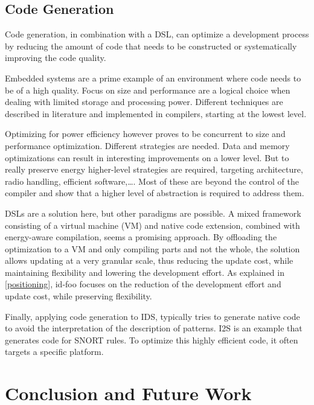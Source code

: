 \documentclass[conference]{IEEEtran}
\newcommand{\NAME}{id-foo\xspace}
\begin{document}
\subsection{Code Generation}

Code generation, in combination with a DSL, can optimize a development process
by reducing the amount of code that needs to be constructed or systematically
improving the code quality.

Embedded systems are a prime example of an environment where code needs to be
of a high quality. Focus on size and performance are a logical choice when
dealing with limited storage and processing power. Different techniques are
described in literature and implemented in compilers, starting at the lowest
level\cite{leupers2000code, marwedel2002code}.

Optimizing for power efficiency however proves to be concurrent to size and
performance optimization. Different strategies are needed. Data and memory
optimizations \cite{panda2001data} can result in interesting improvements on a
lower level. But to really preserve energy higher-level strategies are
required, targeting architecture, radio handling, efficient
software,\dots\cite{naik2001software}. Most of these are beyond the control of
the compiler and show that a higher level of abstraction is required to address
them.

DSLs are a solution here, but other paradigms are possible. A mixed framework
consisting of a virtual machine (VM) and native code
extension\cite{sadilek2007energy}, combined with energy-aware compilation,
seems a promising approach. By offloading the optimization to a VM and only
compiling parts and not the whole, the solution allows updating at a very
granular scale, thus reducing the update cost, while maintaining flexibility
and lowering the development effort. As explained in \ref{positioning}, \NAME
focuses on the reduction of the development effort and update cost, while
preserving flexibility.

Finally, applying code generation to IDS, typically tries to generate native
code to avoid the interpretation of the description of patterns.
I2S\cite{charitakis2003code} is an example that generates code for
SNORT\cite{roesch1999snort} rules. To optimize this highly efficient code, it
often targets a specific platform.

\section{Conclusion and Future Work}
\label{conclusion}
\end{document}

